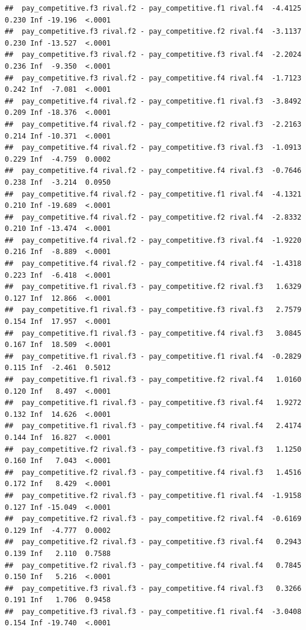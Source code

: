 \documentclass[
]{article}
\begin{document}
\begin{verbatim}
##  pay_competitive.f3 rival.f2 - pay_competitive.f1 rival.f4  -4.4125 0.230 Inf -19.196  <.0001
##  pay_competitive.f3 rival.f2 - pay_competitive.f2 rival.f4  -3.1137 0.230 Inf -13.527  <.0001
##  pay_competitive.f3 rival.f2 - pay_competitive.f3 rival.f4  -2.2024 0.236 Inf  -9.350  <.0001
##  pay_competitive.f3 rival.f2 - pay_competitive.f4 rival.f4  -1.7123 0.242 Inf  -7.081  <.0001
##  pay_competitive.f4 rival.f2 - pay_competitive.f1 rival.f3  -3.8492 0.209 Inf -18.376  <.0001
##  pay_competitive.f4 rival.f2 - pay_competitive.f2 rival.f3  -2.2163 0.214 Inf -10.371  <.0001
##  pay_competitive.f4 rival.f2 - pay_competitive.f3 rival.f3  -1.0913 0.229 Inf  -4.759  0.0002
##  pay_competitive.f4 rival.f2 - pay_competitive.f4 rival.f3  -0.7646 0.238 Inf  -3.214  0.0950
##  pay_competitive.f4 rival.f2 - pay_competitive.f1 rival.f4  -4.1321 0.210 Inf -19.689  <.0001
##  pay_competitive.f4 rival.f2 - pay_competitive.f2 rival.f4  -2.8332 0.210 Inf -13.474  <.0001
##  pay_competitive.f4 rival.f2 - pay_competitive.f3 rival.f4  -1.9220 0.216 Inf  -8.889  <.0001
##  pay_competitive.f4 rival.f2 - pay_competitive.f4 rival.f4  -1.4318 0.223 Inf  -6.418  <.0001
##  pay_competitive.f1 rival.f3 - pay_competitive.f2 rival.f3   1.6329 0.127 Inf  12.866  <.0001
##  pay_competitive.f1 rival.f3 - pay_competitive.f3 rival.f3   2.7579 0.154 Inf  17.957  <.0001
##  pay_competitive.f1 rival.f3 - pay_competitive.f4 rival.f3   3.0845 0.167 Inf  18.509  <.0001
##  pay_competitive.f1 rival.f3 - pay_competitive.f1 rival.f4  -0.2829 0.115 Inf  -2.461  0.5012
##  pay_competitive.f1 rival.f3 - pay_competitive.f2 rival.f4   1.0160 0.120 Inf   8.497  <.0001
##  pay_competitive.f1 rival.f3 - pay_competitive.f3 rival.f4   1.9272 0.132 Inf  14.626  <.0001
##  pay_competitive.f1 rival.f3 - pay_competitive.f4 rival.f4   2.4174 0.144 Inf  16.827  <.0001
##  pay_competitive.f2 rival.f3 - pay_competitive.f3 rival.f3   1.1250 0.160 Inf   7.043  <.0001
##  pay_competitive.f2 rival.f3 - pay_competitive.f4 rival.f3   1.4516 0.172 Inf   8.429  <.0001
##  pay_competitive.f2 rival.f3 - pay_competitive.f1 rival.f4  -1.9158 0.127 Inf -15.049  <.0001
##  pay_competitive.f2 rival.f3 - pay_competitive.f2 rival.f4  -0.6169 0.129 Inf  -4.777  0.0002
##  pay_competitive.f2 rival.f3 - pay_competitive.f3 rival.f4   0.2943 0.139 Inf   2.110  0.7588
##  pay_competitive.f2 rival.f3 - pay_competitive.f4 rival.f4   0.7845 0.150 Inf   5.216  <.0001
##  pay_competitive.f3 rival.f3 - pay_competitive.f4 rival.f3   0.3266 0.191 Inf   1.706  0.9458
##  pay_competitive.f3 rival.f3 - pay_competitive.f1 rival.f4  -3.0408 0.154 Inf -19.740  <.0001

\end{verbatim}
\end{document}
